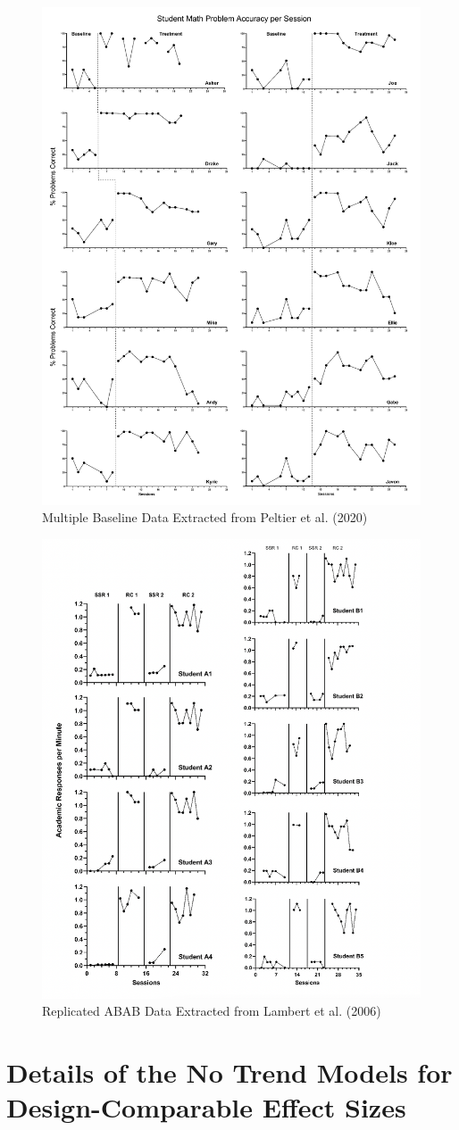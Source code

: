\documentclass[
]{book}
\begin{document}
\begin{figure}
\includegraphics[width=0.5\linewidth,height=0.75\textheight]{images/Peltier2020} \caption{Multiple Baseline Data Extracted from Peltier et al. (2020)}\label{fig:Peltier-2020}
\end{figure}

\begin{figure}
\includegraphics[width=0.5\linewidth,height=0.75\textheight]{images/Lambert2006} \caption{Replicated ABAB Data Extracted from Lambert et al. (2006)}\label{fig:Lambert-2006}
\end{figure}

\hypertarget{details-of-the-no-trend-models-for-design-comparable-effect-sizes}{%
\section{Details of the No Trend Models for Design-Comparable Effect Sizes}\label{details-of-the-no-trend-models-for-design-comparable-effect-sizes}}
\end{document}
